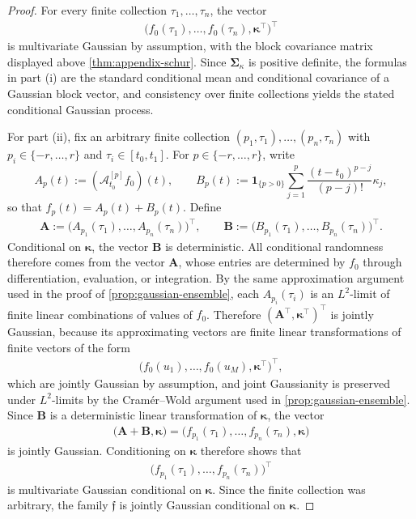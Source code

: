 \documentclass[11pt,a4paper]{article}
\theoremstyle{definition}
\theoremstyle{remark}
\begin{document}
\begin{proof}
For every finite collection \(\tau_1,\ldots,\tau_n\), the vector
\begin{align*}
\bigl(f_0(\tau_1),\ldots,f_0(\tau_n),\boldsymbol{\kappa}^\top\bigr)^\top
\end{align*}
is multivariate Gaussian by assumption, with the block covariance matrix displayed above \cref{thm:appendix-schur}. Since \(\boldsymbol{\Sigma}_{\kappa}\) is positive definite, the formulas in part (i) are the standard conditional mean and conditional covariance of a Gaussian block vector, and consistency over finite collections yields the stated conditional Gaussian process.

For part (ii), fix an arbitrary finite collection \((p_1,\tau_1),\ldots,(p_n,\tau_n)\) with \(p_i\in\{-r,\ldots,r\}\) and \(\tau_i\in[t_0,t_1]\). For \(p\in\{-r,\ldots,r\}\), write
\[
A_p(t):=(\mathcal A_{t_0}^{[p]}f_0)(t),
\qquad
B_p(t):=\mathbf{1}_{\{p>0\}}\sum_{j=1}^{p}\frac{(t-t_0)^{p-j}}{(p-j)!}\kappa_j,
\]
so that \(f_p(t)=A_p(t)+B_p(t)\). Define
\begin{align*}
\mathbf A :=\bigl(A_{p_1}(\tau_1),\ldots,A_{p_n}(\tau_n)\bigr)^\top,\qquad \mathbf B :=\bigl(B_{p_1}(\tau_1),\ldots,B_{p_n}(\tau_n)\bigr)^\top.
\end{align*}
Conditional on \(\boldsymbol{\kappa}\), the vector \(\mathbf B\) is deterministic. All conditional randomness therefore comes from the vector \(\mathbf A\), whose entries are determined by \(f_0\) through differentiation, evaluation, or integration.
By the same approximation argument used in the proof of \cref{prop:gaussian-ensemble}, each \(A_{p_i}(\tau_i)\) is an \(L^2\)-limit of finite linear combinations of values of \(f_0\). Therefore \((\mathbf A^\top,\boldsymbol{\kappa}^\top)^\top\) is jointly Gaussian, because its approximating vectors are finite linear transformations of finite vectors of the form
\begin{align*}
\bigl(f_0(u_1),\ldots,f_0(u_M),\boldsymbol{\kappa}^\top\bigr)^\top,
\end{align*}
which are jointly Gaussian by assumption, and joint Gaussianity is preserved under \(L^2\)-limits by the Cram\'er--Wold argument used in \cref{prop:gaussian-ensemble}. Since \(\mathbf B\) is a deterministic linear transformation of \(\boldsymbol{\kappa}\), the vector
\begin{align*}
\bigl(\mathbf A+\mathbf B,\boldsymbol{\kappa}\bigr)
=
\bigl(f_{p_1}(\tau_1),\ldots,f_{p_n}(\tau_n),\boldsymbol{\kappa}\bigr)
\end{align*}
is jointly Gaussian. Conditioning on \(\boldsymbol{\kappa}\) therefore shows that
\begin{align*}
\bigl(f_{p_1}(\tau_1),\ldots,f_{p_n}(\tau_n)\bigr)^\top
\end{align*}
is multivariate Gaussian conditional on \(\boldsymbol{\kappa}\). Since the finite collection was arbitrary, the family \(\mathfrak f\) is jointly Gaussian conditional on \(\boldsymbol{\kappa}\).


\end{proof}
\end{document}
